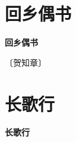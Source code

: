 \documentclass[12pt,UTF-8,openany,fontset=none]{ctexbook}
\begin{document}
\vspace{8pt}
\clearpage


\section{回乡偶书}



\begin{center}
    {\bfseries 回乡偶书}
\end{center}

\begin{center}
    \vspace{10pt}
    
    \begin{large}
        
        〔贺知章〕
        
    \end{large}
    
    \vspace{8pt}
    
    \begin{huge}
        
        \phantom{。}

        \phantom{。}
        
        \phantom{。}

        \phantom{。}
        
    \end{huge}
    
\end{center}

\vspace{8pt}
\clearpage


\section{长歌行}



\begin{center}
    {\bfseries 长歌行}
\end{center}
\end{document}
